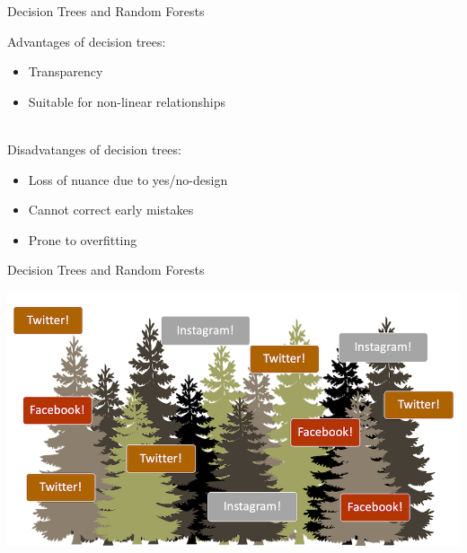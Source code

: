 \documentclass[handout]{beamer}
\begin{document}
\begin{frame}{Decision Trees and Random Forests} 
	
	Advantages of decision trees:
	\begin{itemize}
		\item Transparency
		\item Suitable for non-linear relationships \\\
	\end{itemize}
	
	Disadvatanges of decision trees:
	\begin{itemize}
		\item Loss of nuance due to yes/no-design
		\item Cannot correct early mistakes
		\item Prone to overfitting
	\end{itemize}
	
	
\end{frame}


\begin{frame}{Decision Trees and Random Forests}
	
	\begin{center}
		\includegraphics[width=\linewidth,height=\textheight,keepaspectratio]{../pictures/randomforest.png} \\\
	\end{center}
	
	
	
	
	
\end{frame}
\end{document}
